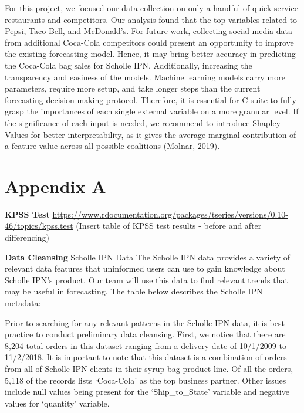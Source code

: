 \documentclass[12pt,oneside]{chicagocapstone}
\begin{document}
For this project, we focused our data collection on only a handful of quick service restaurants and competitors. Our analysis found that the top variables related to Pepsi, Taco Bell, and McDonald's. For future work, collecting social media data from additional Coca-Cola competitors could present an opportunity to improve the existing forecasting model. Hence, it may bring better accuracy in predicting the Coca-Cola bag sales for Scholle IPN. Additionally, increasing the transparency and easiness of the models. Machine learning models carry more parameters, require more setup, and take longer steps than the current forecasting decision-making protocol. Therefore, it is essential for C-suite to fully grasp the importances of each single external variable on a more granular level. If the significance of each input is needed, we recommend to introduce Shapley Values for better interpretability, as it gives the average marginal contribution of a feature value across all possible coalitions (Molnar, 2019).

\newpage

\appendix

\hypertarget{appendix}{%
\chapter*{Appendix A}\label{appendix}}

\textbf{KPSS Test}
\url{https://www.rdocumentation.org/packages/tseries/versions/0.10-46/topics/kpss.test}
(Insert table of KPSS test results - before and after differencing)

\textbf{Data Cleansing}
Scholle IPN Data
The Scholle IPN data provides a variety of relevant data features that uninformed users can use to gain knowledge about Scholle IPN's product. Our team will use this data to find relevant trends that may be useful in forecasting. The table below describes the Scholle IPN metadata:

Prior to searching for any relevant patterns in the Scholle IPN data, it is best practice to conduct preliminary data cleansing. First, we notice that there are 8,204 total orders in this dataset ranging from a delivery date of 10/1/2009 to 11/2/2018. It is important to note that this dataset is a combination of orders from all of Scholle IPN clients in their syrup bag product line. Of all the orders, 5,118 of the records lists `Coca-Cola' as the top business partner. Other issues include null values being present for the `Ship\_to\_State' variable and negative values for `quantity' variable.
\end{document}
